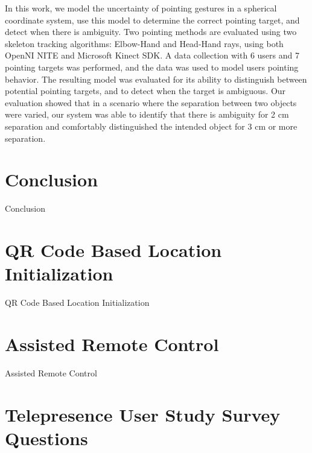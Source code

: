 \documentclass[12pt]{gatech-thesis}
\begin{document}
In this work, we model the uncertainty of pointing gestures in a spherical coordinate system, use this model to determine the correct pointing target, and detect when there is ambiguity. Two pointing methods are evaluated using two skeleton tracking algorithms: Elbow-Hand and Head-Hand rays, using both OpenNI NITE and Microsoft Kinect SDK.  A data collection with 6 users and 7 pointing targets was performed, and the data was used to model users pointing behavior.  The resulting model was evaluated for its ability to distinguish between potential pointing targets, and to detect when the target is ambiguous. Our evaluation showed that in a scenario where the separation between two objects were varied, our system was able to identify that there is ambiguity for 2 cm separation and comfortably distinguished the intended object for 3 cm or more separation.













\chapter{Conclusion}
\label{chapter:conclusion}

Conclusion

\appendix
\chapter{QR Code Based Location Initialization}
\label{chapter:qr_code_based_location_initialization}

QR Code Based Location Initialization

\chapter{Assisted Remote Control}
\label{chapter:assisted_remote_control}

Assisted Remote Control

\chapter{Telepresence User Study Survey Questions}
\label{chapter:telepresence_user_study_survey_questions}
\end{document}
